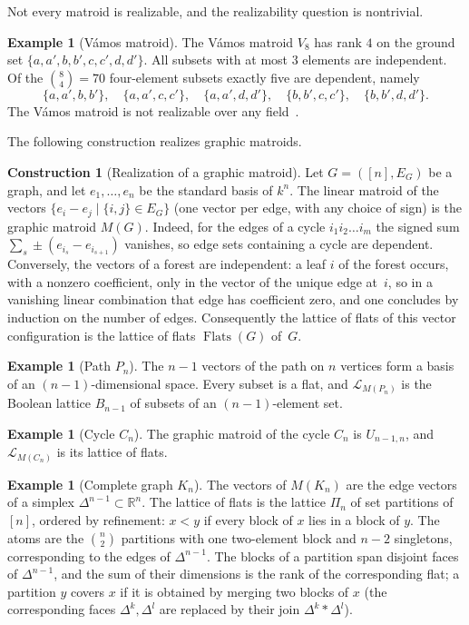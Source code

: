 \documentclass[11pt,a4paper]{article}
\numberwithin{equation}{section}
\theoremstyle{plain}
\theoremstyle{definition}
\newtheorem{construction}[theorem]{Construction}
\newtheorem{example}[theorem]{Example}
\theoremstyle{remark}
\newcommand{\R}{\mathbb{R}}
\newcommand{\cL}{\mathcal{L}}
\DeclareMathOperator{\Flats}{Flats}
\begin{document}
Not every matroid is realizable, and the realizability question is nontrivial.

\begin{example}[Vámos matroid]
The Vámos matroid $V_8$ has rank $4$ on the ground set $\{a,a',b,b',c,c',d,d'\}$. All subsets with at most $3$ elements are independent. Of the $\binom84=70$ four-element subsets exactly five are dependent, namely
\[
\{a,a',b,b'\},\quad\{a,a',c,c'\},\quad\{a,a',d,d'\},\quad\{b,b',c,c'\},\quad\{b,b',d,d'\}.
\] The Vámos matroid is not realizable over any field~\cite{Oxl11}.
\end{example}

The following construction realizes graphic matroids.

\begin{construction}[Realization of a graphic matroid]\label{con:graphic}
Let $G=([n],E_G)$ be a graph, and let $e_1,\dots,e_n$ be the standard basis of $k^n$. The linear matroid of the vectors $\{e_i-e_j\mid\{i,j\}\in E_G\}$ (one vector per edge, with any choice of sign) is the graphic matroid $M(G)$. Indeed, for the edges of a cycle $i_1i_2\dots i_m$ the signed sum $\sum_s\pm(e_{i_s}-e_{i_{s+1}})$ vanishes, so edge sets containing a cycle are dependent. Conversely, the vectors of a forest are independent: a leaf $i$ of the forest occurs, with a nonzero coefficient, only in the vector of the unique edge at~$i$, so in a vanishing linear combination that edge has coefficient zero, and one concludes by induction on the number of edges. Consequently the lattice of flats of this vector configuration is the lattice of flats $\Flats(G)$ of~$G$.
\end{construction}

\begin{example}[Path $P_n$]
The $n-1$ vectors of the path on $n$ vertices form a basis of an $(n-1)$-dimensional space. Every subset is a flat, and $\cL_{M(P_n)}$ is the Boolean lattice $B_{n-1}$ of subsets of an $(n-1)$-element set.
\end{example}

\begin{example}[Cycle $C_n$]
The graphic matroid of the cycle $C_n$ is $U_{n-1,n}$, and $\cL_{M(C_n)}$ is its lattice of flats.
\end{example}

\begin{example}[Complete graph $K_n$]
The vectors of $M(K_n)$ are the edge vectors of a simplex $\Delta^{n-1}\subset\R^n$. The lattice of flats is the lattice $\Pi_n$ of set partitions of $[n]$, ordered by refinement: $x<y$ if every block of $x$ lies in a block of $y$. The atoms are the $\binom n2$ partitions with one two-element block and $n-2$ singletons, corresponding to the edges of $\Delta^{n-1}$. The blocks of a partition span disjoint faces of $\Delta^{n-1}$, and the sum of their dimensions is the rank of the corresponding flat; a partition $y$ covers $x$ if it is obtained by merging two blocks of $x$ (the corresponding faces $\Delta^k,\Delta^l$ are replaced by their join $\Delta^k*\Delta^l$).
\end{example}
\end{document}
